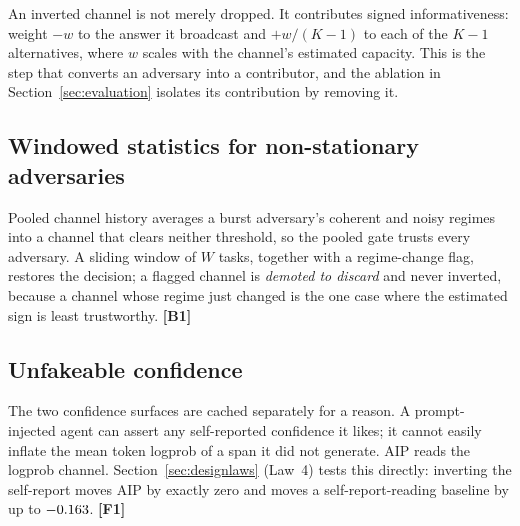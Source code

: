 An inverted channel is not merely dropped. It contributes signed informativeness:
weight $-w$ to the answer it broadcast and $+w/(K-1)$ to each of the $K-1$
alternatives, where $w$ scales with the channel's estimated capacity. This is the
step that converts an adversary into a contributor, and the ablation in
Section~\ref{sec:evaluation} isolates its contribution by removing it.

\subsection{Windowed statistics for non-stationary adversaries}

Pooled channel history averages a burst adversary's coherent and noisy regimes
into a channel that clears neither threshold, so the pooled gate trusts every
adversary. A sliding window of $W$ tasks, together with a regime-change flag,
restores the decision; a flagged channel is \emph{demoted to discard} and never
inverted, because a channel whose regime just changed is the one case where the
estimated sign is least trustworthy. \textbf{[B1]}

\subsection{Unfakeable confidence}

The two confidence surfaces are cached separately for a reason. A prompt-injected
agent can assert any self-reported confidence it likes; it cannot easily inflate
the mean token logprob of a span it did not generate. AIP reads the logprob
channel. Section~\ref{sec:designlaws} (Law~4) tests this directly: inverting the self-report
moves AIP by exactly zero and moves a self-report-reading baseline by up to
$-0.163$. \textbf{[F1]}
